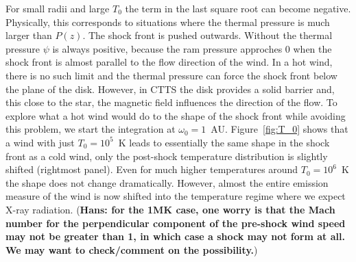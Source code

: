 For small radii and large $T_0$ the term in the last square root can become negative. Physically, this corresponds to situations where the thermal pressure is much larger than $P(z)$. The shock front is pushed outwards. Without the thermal pressure $\psi$ is always positive, because the ram pressure approches 0 when the shock front is almost parallel to the flow direction of the wind. In a hot wind, there is no such limit and the thermal pressure can force the shock front below the plane of the disk. However, in CTTS the disk provides a solid barrier and, this close to the star, the magnetic field influences the direction of the flow. To explore what a hot wind would do to the shape of the shock front while avoiding this problem, we start the integration at $\omega_0=1$~AU. Figure~\ref{fig:T_0} shows that a wind with just $T_0=10^5$~K leads to essentially the same shape in the shock front as a cold wind, only the post-shock temperature distribution is slightly shifted (rightmost panel). Even for much higher temperatures around $T_0=10^6$~K the shape does not change dramatically. However, almost the entire emission measure of the wind is now shifted into the temperature regime where we expect X-ray radiation. ({\bf Hans: for the 1MK case, one worry is that the Mach number for the perpendicular component of the pre-shock wind speed may not be greater than 1, in which case a shock may not form at all. We may want to check/comment on the possibility.})
